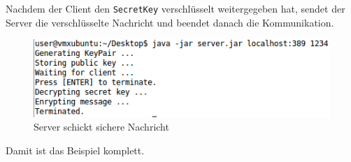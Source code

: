 Nachdem der Client den \texttt{SecretKey} verschlüsselt weitergegeben hat, sendet der Server die verschlüsselte Nachricht und beendet danach die Kommunikation.
\clearpage
\begin{figure}[!h]
	\begin{center}
		\includegraphics[width=0.6\linewidth]{images/server2.png}
		\caption{Server schickt sichere Nachricht}
		\label{server2}
	\end{center}
\end{figure}
Damit ist das Beispiel komplett.